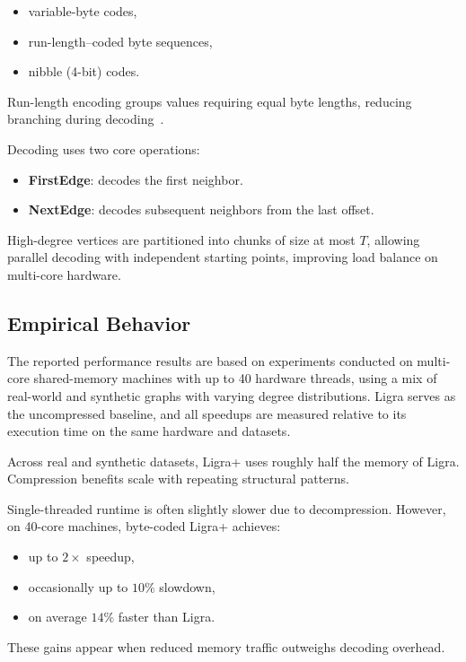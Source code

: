 \documentclass[a4paper,USenglish]{lipics-v2021}
\begin{document}
\begin{itemize}
    \item variable-byte codes,
    \item run-length–coded byte sequences,
    \item nibble (4-bit) codes.
\end{itemize}

Run-length encoding groups values requiring equal byte lengths, reducing branching during decoding~\cite{shun2015ligra+}.

Decoding uses two core operations:

\begin{itemize}
    \item \textbf{FirstEdge}: decodes the first neighbor.
    \item \textbf{NextEdge}: decodes subsequent neighbors from the last offset.
\end{itemize}

High-degree vertices are partitioned into chunks of size at most $T$, allowing parallel decoding with independent starting points, improving load balance on multi-core hardware.

\subsection{Empirical Behavior}
The reported performance results are based on experiments conducted on multi-core shared-memory machines with up to 40 hardware threads, using a mix of real-world and synthetic graphs with varying degree distributions. Ligra serves as the uncompressed baseline, and all speedups are measured relative to its execution time on the same hardware and datasets.

Across real and synthetic datasets, Ligra+ uses roughly half the memory of Ligra. Compression benefits scale with repeating structural patterns.

Single-threaded runtime is often slightly slower due to decompression. However, on 40-core machines, byte-coded Ligra+ achieves:

\begin{itemize}
    \item up to $2\times$ speedup,
    \item occasionally up to $10\%$ slowdown,
    \item on average $14\%$ faster than Ligra.
\end{itemize}

These gains appear when reduced memory traffic outweighs decoding overhead.
\end{document}

